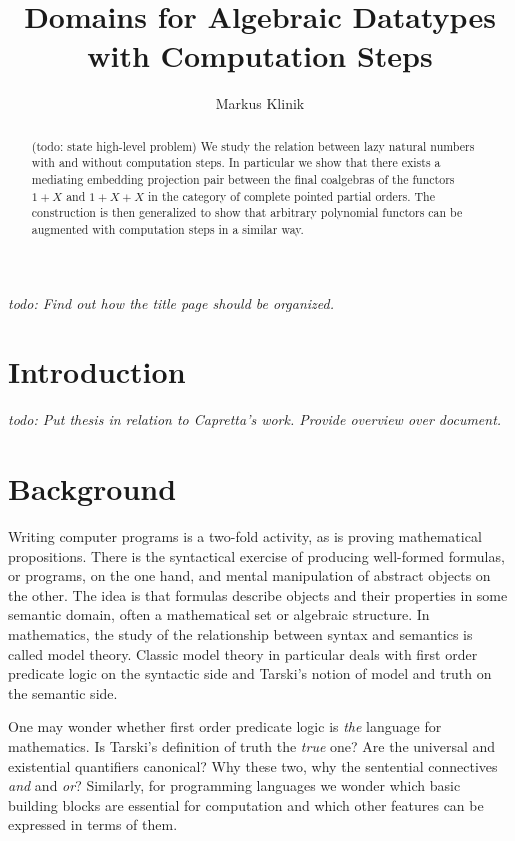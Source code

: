\documentclass[a4paper]{article}
\newcommand{\todo}[1]{\smallskip \noindent \emph{todo: #1} \smallskip}
\begin{document}
\title{Domains for Algebraic Datatypes with Computation Steps}
\author{Markus Klinik}
\maketitle

\todo{Find out how the title page should be organized.}

\begin{abstract}

(todo: state high-level problem) We study the relation between lazy natural numbers with and without computation
steps. In particular we show that there exists a mediating em\-bed\-ding
projection pair between the final coalgebras of the functors $1+X$ and $1+X+X$
in the category of complete pointed partial orders. The construction is then
generalized to show that arbitrary polynomial functors can be augmented with
computation steps in a similar way.

\end{abstract}

\section{Introduction}

\todo{Put thesis in relation to Capretta's work. Provide overview over document.}

\section{Background}

Writing computer programs is a two-fold activity, as is proving mathematical
propositions. There is the syntactical exercise of producing well-formed
formulas, or programs, on the one hand, and mental manipulation of
abstract objects on the other. The idea is that formulas describe objects
and their properties in some semantic domain, often a mathematical set or
algebraic structure. In mathematics, the study of the relationship between
syntax and semantics is called model theory.  Classic model theory in particular
deals with first order predicate logic on the syntactic side and Tarski's notion
of model and truth on the semantic side.

One may wonder whether first order predicate logic is \emph{the} language for
mathematics. Is Tarski's definition of truth the \emph{true} one?  Are the
universal and existential quantifiers canonical? Why these two, why the
sentential connectives \emph{and} and \emph{or}? Similarly, for programming
languages we wonder which basic building blocks are essential for computation
and which other features can be expressed in terms of them.
\end{document}
